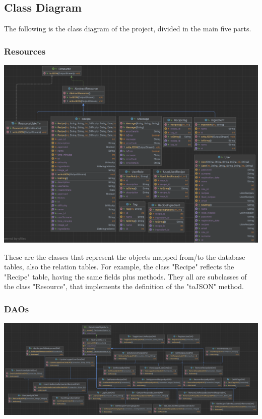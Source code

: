 \subsection{Class Diagram}

The following is the class diagram of the project, divided in the main five parts.

\subsubsection{Resources}

\includegraphics[width=\textwidth]{images/resources.png}

These are the classes that represent the objects mapped from/to the database tables, also the relation tables. For example, the class "Recipe" reflects the "Recipe" table, having the same fields plus methods. They all are subclasses of the class "Resource", that implements the definition of the "toJSON" method.

\subsubsection{DAOs}

\includegraphics[width=\textwidth]{images/dao.png}

